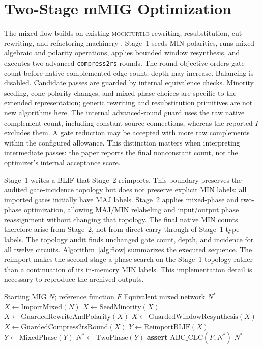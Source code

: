 \documentclass[10pt,journal]{IEEEtran}
\begin{document}
\section{Two-Stage mMIG Optimization}
\label{sec:method}
The mixed flow builds on existing \textsc{mockturtle} rewriting,
resubstitution, cut rewriting, and refactoring machinery
\cite{soeken2022libraries,riener2019generic}. Stage~1 seeds MIN
polarities, runs mixed algebraic and polarity operations, applies bounded
window resynthesis, and executes two advanced \texttt{compress2rs} rounds.
The round objective orders gate count before native complemented-edge count;
depth may increase. Balancing is disabled. Candidate passes are guarded by
internal equivalence checks. Minority seeding, cone polarity changes, and
mixed phase choices are specific to the extended representation; generic
rewriting and resubstitution primitives are not new algorithms here.
The internal advanced-round guard uses the raw native complement count,
including constant-source connections, whereas the reported $I$ excludes
them. A gate reduction may be accepted with more raw complements within
the configured allowance. This distinction matters when interpreting
intermediate passes: the paper reports the final nonconstant count, not
the optimizer's internal acceptance score.

Stage~1 writes a BLIF that Stage~2 reimports. This boundary preserves the
audited gate-incidence topology but does not preserve explicit MIN labels:
all imported gates initially have MAJ labels. Stage~2 applies mixed-phase
and two-phase optimization, allowing MAJ/MIN relabeling and input/output
phase reassignment without changing that topology. The final native MIN
counts therefore arise from Stage~2, not from direct carry-through of
Stage~1 type labels. The topology audit finds unchanged gate count, depth,
and incidence for all twelve circuits. Algorithm~\ref{alg:flow} summarizes
the executed sequence.
The reimport makes the second stage a phase search on the Stage~1
topology rather than a continuation of its in-memory MIN labels. This
implementation detail is necessary to reproduce the archived outputs.

\begin{algorithm}[t]
\caption{Two-stage native mMIG optimization}
\label{alg:flow}
\begin{algorithmic}[1]
\Require Starting MIG $N$; reference function $F$
\Ensure Equivalent mixed network $N^{*}$
\State $X\gets\mathrm{ImportMixed}(N)$
\State $X\gets\mathrm{SeedMinority}(X)$
\State $X\gets\mathrm{GuardedRewriteAndPolarity}(X)$
\State $X\gets\mathrm{GuardedWindowResynthesis}(X)$
  \State $X\gets\mathrm{GuardedCompress2rsRound}(X)$
\EndFor
\State $Y\gets\mathrm{ReimportBLIF}(X)$ 
\State $Y\gets\mathrm{MixedPhase}(Y)$
\State $N^{*}\gets\mathrm{TwoPhase}(Y)$ 
\State \textbf{assert} $\mathrm{ABC\_CEC}(F,N^{*})$
\State \Return $N^{*}$
\end{algorithmic}
\end{algorithm}
\end{document}
